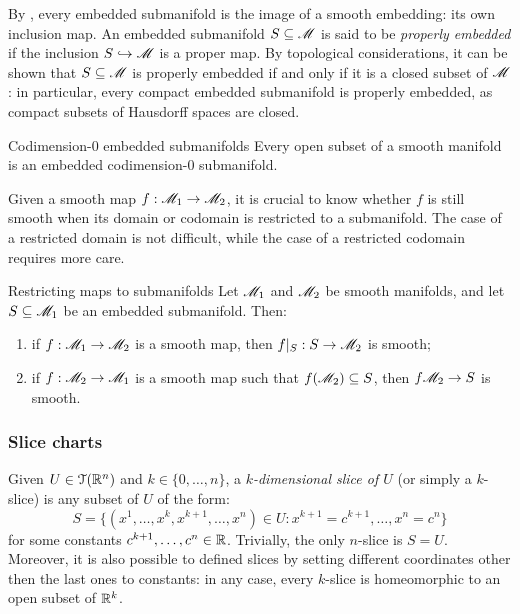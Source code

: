By , every embedded submanifold is the image of a smooth embedding: its own inclusion map. An embedded submanifold $ S \subseteq \mathscr{M} $ is said to be \emph{properly embedded} if the inclusion $ S \hookrightarrow \mathscr{M} $ is a proper map. By topological considerations, it can be shown that $ S \subseteq \mathscr{M} $ is properly embedded if and only if it is a closed subset of $ \mathscr{M} $: in particular, every compact embedded submanifold is properly embedded, as compact subsets of Hausdorff spaces are closed.

\begin{lemma}{Codimension-$ 0 $ embedded submanifolds}{}
  Every open subset of a smooth manifold is an embedded codimension-$ 0 $ submanifold.
\end{lemma}

Given a smooth map $ f : \mathscr{M}_1 \rightarrow \mathscr{M}_2 $, it is crucial to know whether $ f $ is still smooth when its domain or codomain is restricted to a submanifold. The case of a restricted domain is not difficult, while the case of a restricted codomain requires more care.

\begin{theorem}{Restricting maps to submanifolds}{}
  Let $ \mathscr{M}_1 $ and $ \mathscr{M}_2 $ be smooth manifolds, and let $ S \subseteq \mathscr{M}_1 $ be an embedded submanifold. Then:
  \begin{enumerate}
    \item \label{item:rms-1} if $ f : \mathscr{M}_1 \rightarrow \mathscr{M}_2 $ is a smooth map, then $ f \vert_S : S \rightarrow \mathscr{M}_2 $ is smooth;
    \item \label{item:rms-2} if $ f : \mathscr{M}_2 \rightarrow \mathscr{M}_1 $ is a smooth map such that $ f(\mathscr{M}_2) \subseteq S $, then $ f \mathscr{M}_2 \rightarrow S $ is smooth.
  \end{enumerate}
\end{theorem}

\subsubsection{Slice charts}

Given $ U \in \EuScript{T}(\mathbb{R}^n) $ and $ k \in \{0,\dots,n\} $, a \emph{$ k $-dimensional slice of $ U $} (or simply a $ k $-slice) is any subset of $ U $ of the form:
\begin{equation*}
  S = \{(x^1 , \dots , x^k , x^{k+1} , \dots , x^n) \in U : x^{k+1} = c^{k+1} , \dots , x^n = c^n\}
\end{equation*}
for some constants $ c^{k+1} , \dots , c^n \in \mathbb{R} $. Trivially, the only $ n $-slice is $ S = U $. Moreover, it is also possible to defined slices by setting different coordinates other then the last ones to constants: in any case, every $ k $-slice is homeomorphic to an open subset of $ \mathbb{R}^k $.

